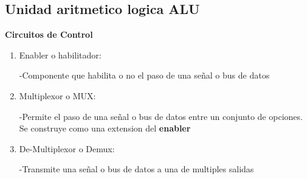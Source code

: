\documentclass{article}
\begin{document}
        \subsection{Unidad aritmetico logica ALU}
        \textbf{Circuitos de Control}
        \begin{enumerate}
            \item Enabler o habilitador: \begin{center}
                 -Componente que habilita o no el paso de una señal o bus de datos
            
            \end{center}
            \item Multiplexor o MUX:  \begin{center}
                -Permite el paso de una señal o bus de datos entre un conjunto de opciones. 
                Se construye como una extension del \textbf{enabler}
            \end{center}
            \item De-Multiplexor o Demux: \begin{center}
                -Transmite una señal o bus de datos a una de multiples salidas
            \end{center}
        \end{enumerate}
\end{document}
